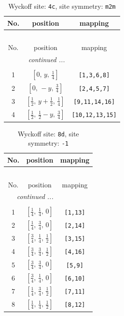 \documentclass[fleqn,8pt]{jsarticle}
\begin{document}
\renewcommand{\arraystretch}{1.2}
\begin{longtable}{ccc}
\caption{Wyckoff site: {\tt 4c}, site symmetry: {\tt m2m}}
 \\
 \hline \hline
No. & position & mapping \\ \hline \endfirsthead

\multicolumn{2}{l}{\tablename\ \thetable{}} \\
 \hline \hline
No. & position & mapping \\ \hline \endhead

 \hline \hline
\multicolumn{2}{r}{\footnotesize\it continued ...} \\ \endfoot

 \hline \hline
\multicolumn{2}{r}{} \\ \endlastfoot

1 & $\left[ 0,\, y,\, \frac{1}{4} \right]$ & {\tt [1,3,6,8]} \\ \hline
2 & $\left[ 0,\, - y,\, \frac{3}{4} \right]$ & {\tt [2,4,5,7]} \\ \hline
3 & $\left[ \frac{1}{2},\, y + \frac{1}{2},\, \frac{1}{4} \right]$ & {\tt [9,11,14,16]} \\ \hline
4 & $\left[ \frac{1}{2},\, \frac{1}{2} - y,\, \frac{3}{4} \right]$ & {\tt [10,12,13,15]} \\
\end{longtable}
\renewcommand{\arraystretch}{1.2}
\begin{longtable}{ccc}
\caption{Wyckoff site: {\tt 8d}, site symmetry: {\tt -1}}
 \\
 \hline \hline
No. & position & mapping \\ \hline \endfirsthead

\multicolumn{2}{l}{\tablename\ \thetable{}} \\
 \hline \hline
No. & position & mapping \\ \hline \endhead

 \hline \hline
\multicolumn{2}{r}{\footnotesize\it continued ...} \\ \endfoot

 \hline \hline
\multicolumn{2}{r}{} \\ \endlastfoot

1 & $\left[ \frac{1}{4},\, \frac{1}{4},\, 0 \right]$ & {\tt [1,13]} \\ \hline
2 & $\left[ \frac{1}{4},\, \frac{3}{4},\, 0 \right]$ & {\tt [2,14]} \\ \hline
3 & $\left[ \frac{3}{4},\, \frac{1}{4},\, \frac{1}{2} \right]$ & {\tt [3,15]} \\ \hline
4 & $\left[ \frac{3}{4},\, \frac{3}{4},\, \frac{1}{2} \right]$ & {\tt [4,16]} \\ \hline
5 & $\left[ \frac{3}{4},\, \frac{3}{4},\, 0 \right]$ & {\tt [5,9]} \\ \hline
6 & $\left[ \frac{3}{4},\, \frac{1}{4},\, 0 \right]$ & {\tt [6,10]} \\ \hline
7 & $\left[ \frac{1}{4},\, \frac{3}{4},\, \frac{1}{2} \right]$ & {\tt [7,11]} \\ \hline
8 & $\left[ \frac{1}{4},\, \frac{1}{4},\, \frac{1}{2} \right]$ & {\tt [8,12]} \\
\end{longtable}
\end{document}
